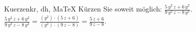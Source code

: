 \begin{MAufgabe}{Kuerzen}{kr, dh, MaTeX}
K\"urzen Sie soweit m\"oglich: $\frac{5\, y^2\, z + 6\, y^2}{9\, y^2\, z - 8\, y^2}$.\\ 
\ifLsg\MLoesung
\quad $\frac{5\, y^2\, z + 6\, y^2}{9\, y^2\, z - 8\, y^2}=\frac{(y^2)\cdot(5\, z + 6)}{(y^2)\cdot(9\, z - 8)}=\frac{5\, z + 6}{9\, z - 8}$.\else\relax\fi
 \end{MAufgabe}